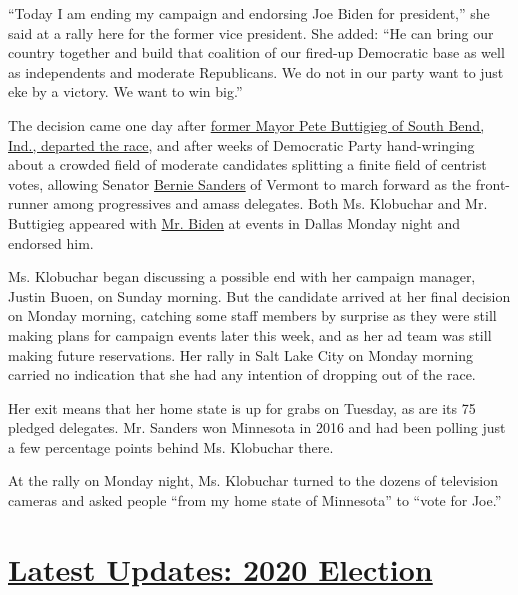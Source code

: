 ``Today I am ending my campaign and endorsing Joe Biden for president,''
she said at a rally here for the former vice president. She added: ``He
can bring our country together and build that coalition of our fired-up
Democratic base as well as independents and moderate Republicans. We do
not in our party want to just eke by a victory. We want to win big.''

The decision came one day after
\href{https://www.nytimes.com/2020/03/01/us/politics/pete-buttigieg-drops-out.html}{former
Mayor Pete Buttigieg of South Bend, Ind., departed the race}, and after
weeks of Democratic Party hand-wringing about a crowded field of
moderate candidates splitting a finite field of centrist votes, allowing
Senator
\href{https://www.nytimes.com/interactive/2020/us/elections/bernie-sanders.html}{Bernie
Sanders} of Vermont to march forward as the front-runner among
progressives and amass delegates. Both Ms. Klobuchar and Mr. Buttigieg
appeared with
\href{https://www.nytimes.com/2020/03/03/podcasts/the-daily/the-stakes-on-super-tuesday.html}{Mr.
Biden} at events in Dallas Monday night and endorsed him.

Ms. Klobuchar began discussing a possible end with her campaign manager,
Justin Buoen, on Sunday morning. But the candidate arrived at her final
decision on Monday morning, catching some staff members by surprise as
they were still making plans for campaign events later this week, and as
her ad team was still making future reservations. Her rally in Salt Lake
City on Monday morning carried no indication that she had any intention
of dropping out of the race.

Her exit means that her home state is up for grabs on Tuesday, as are
its 75 pledged delegates. Mr. Sanders won Minnesota in 2016 and had been
polling just a few percentage points behind Ms. Klobuchar there.

At the rally on Monday night, Ms. Klobuchar turned to the dozens of
television cameras and asked people ``from my home state of Minnesota''
to ``vote for Joe.''

\hypertarget{latest-updates-2020-election}{%
\section{\texorpdfstring{\href{https://www.nytimes.com/2020/07/31/us/elections/biden-vs-trump.html?action=click\&pgtype=Article\&state=default\&region=MAIN_CONTENT_1\&context=storylines_live_updates}{Latest
Updates: 2020
Election}}{Latest Updates: 2020 Election}}\label{latest-updates-2020-election}}

